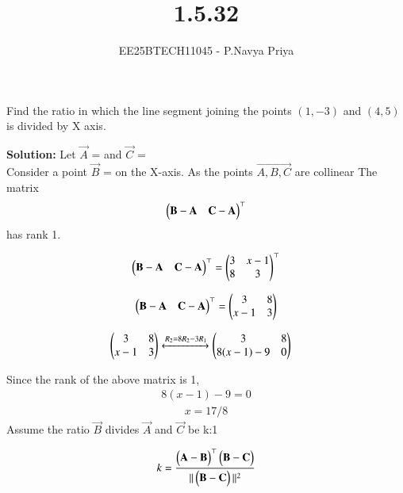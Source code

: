\documentclass[journal,12pt,onecolumn]{IEEEtran}
\theoremstyle{remark}
\begin{document}
\title{1.5.32}
\author{EE25BTECH11045 - P.Navya Priya}
\maketitle
\renewcommand{\thefigure}{\theenumi}
\renewcommand{\thetable}{\theenumi}

\vspace{1cm}

 Find the ratio in which the line segment joining the points $(1,-3)$ and $(4,5)$ is divided
 by X axis.

\vspace{0.75cm}
\textbf{Solution:} Let $\vec{A}$ =  and $\vec{C}$ = \\[5pt]

Consider a point $\vec{B}$ =  on the X-axis.
As the points $\vec{A,B,C}$ are collinear
The matrix 
\begin{align*}
\begin{pmatrix} \mathbf{B}-\mathbf{A} & \mathbf{C}-\mathbf{A} \end{pmatrix}^\top
\end{align*}
has rank 1.

\begin{align}
\begin{pmatrix} \mathbf{B}-\mathbf{A} & \mathbf{C}-\mathbf{A} \end{pmatrix}^\top = \begin{pmatrix}3&x-1\\8&3\end{pmatrix}^\top
\end{align}

\begin{align}
\begin{pmatrix} \mathbf{B}-\mathbf{A} & \mathbf{C}-\mathbf{A} \end{pmatrix}^\top = \begin{pmatrix}3&8\\x-1&3\end{pmatrix}
\end{align}

\begin{align}
\begin{pmatrix}3&8\\x-1&3\end{pmatrix}
 &\xleftrightarrow{R_2 = 8R_2 - 3R_1}
 \begin{pmatrix}3&8\\8(x-1)-9&0\end{pmatrix}
\end{align}

\vspace{0.25cm}
Since the rank of the above matrix is 1,
\begin{align}
    8(x-1)-9 = 0
\end{align}
\begin{align}
    x = 17/8
\end{align}
Assume the ratio $\vec{B}$ divides $\vec{A}$  and $\vec{C}$ be k:1

\begin{align}
    k = \frac{\begin{pmatrix}\mathbf{A} - \mathbf{B}\end{pmatrix}^\top \begin{pmatrix}\mathbf{B} - \mathbf{C}\end{pmatrix}}{||\begin{pmatrix}\mathbf{B} - \mathbf{C}\end{pmatrix}||^2}
\end{align}
\end{document}
